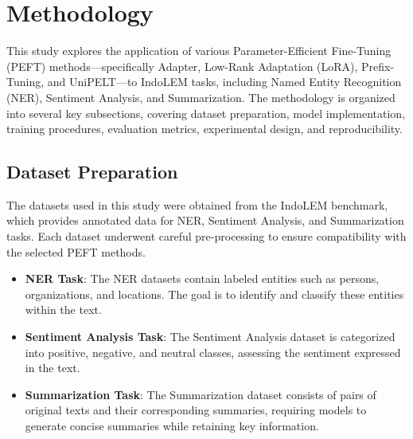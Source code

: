 \section{Methodology}

This study explores the application of various Parameter-Efficient Fine-Tuning (PEFT) methods—specifically Adapter, Low-Rank Adaptation (LoRA), Prefix-Tuning, and UniPELT—to IndoLEM tasks, including Named Entity Recognition (NER), Sentiment Analysis, and Summarization. The methodology is organized into several key subsections, covering dataset preparation, model implementation, training procedures, evaluation metrics, experimental design, and reproducibility.

\subsection{Dataset Preparation}

\begin{table}[htbp]
    \vspace{0.25cm}
    \centering
    \caption{Dataset Details}
    \label{table:dataset-indolem}
\end{table}

The datasets used in this study were obtained from the IndoLEM benchmark, which provides annotated data for NER, Sentiment Analysis, and Summarization tasks. Each dataset underwent careful pre-processing to ensure compatibility with the selected PEFT methods.

\begin{itemize}
    \item \textbf{NER Task}: The NER datasets contain labeled entities such as persons, organizations, and locations. The goal is to identify and classify these entities within the text.
    \item \textbf{Sentiment Analysis Task}: The Sentiment Analysis dataset is categorized into positive, negative, and neutral classes, assessing the sentiment expressed in the text.
    \item \textbf{Summarization Task}: The Summarization dataset consists of pairs of original texts and their corresponding summaries, requiring models to generate concise summaries while retaining key information.
\end{itemize}

